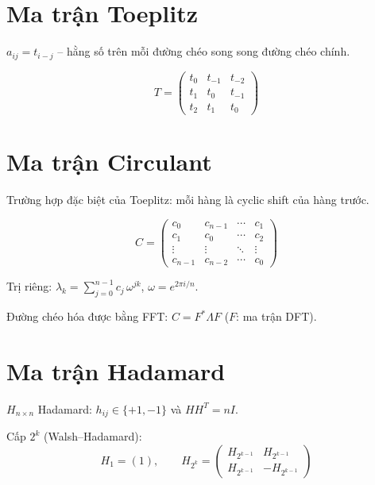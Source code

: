 \section{Ma trận Toeplitz}

$a_{ij} = t_{i-j}$ -- hằng số trên mỗi đường chéo song song đường chéo chính.

\[
T = \begin{pmatrix}
t_0 & t_{-1} & t_{-2} \\
t_1 & t_0 & t_{-1} \\
t_2 & t_1 & t_0
\end{pmatrix}
\]

\section{Ma trận Circulant}

Trường hợp đặc biệt của Toeplitz: mỗi hàng là cyclic shift của hàng trước.

\[
C = \begin{pmatrix}
c_0 & c_{n-1} & \cdots & c_1 \\
c_1 & c_0 & \cdots & c_2 \\
\vdots & \vdots & \ddots & \vdots \\
c_{n-1} & c_{n-2} & \cdots & c_0
\end{pmatrix}
\]

Trị riêng: $\lambda_k = \sum_{j=0}^{n-1} c_j \, \omega^{jk}$, \; $\omega = e^{2\pi i/n}$.

Đường chéo hóa được bằng FFT: $C = F^* \Lambda F$ ($F$: ma trận DFT).

\section{Ma trận Hadamard}

$H_{n \times n}$ Hadamard: $h_{ij} \in \{+1, -1\}$ và $HH^T = nI$.

Cấp $2^k$ (Walsh--Hadamard):
\[
H_1 = (1), \qquad H_{2^k} = \begin{pmatrix} H_{2^{k-1}} & H_{2^{k-1}} \\ H_{2^{k-1}} & -H_{2^{k-1}} \end{pmatrix}
\]

